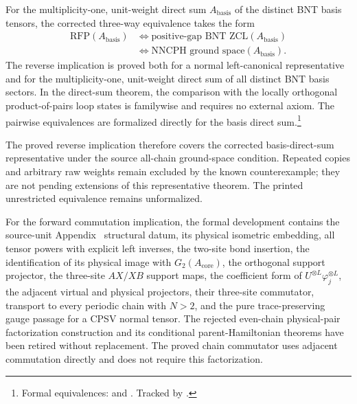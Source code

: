 \documentclass{article}
\begin{document}
For the multiplicity-one, unit-weight direct sum
$A_{\mathrm{basis}}$ of the distinct BNT basis tensors, the corrected
three-way equivalence takes the form
\begin{align}
    \mathrm{RFP}(A_{\mathrm{basis}})
        &\Longleftrightarrow
        \text{positive-gap BNT ZCL}(A_{\mathrm{basis}})
    \label{eq:cpsv16_nncph_ground_state_scope_representative_rfp_zcl}\\
        &\Longleftrightarrow
        \text{NNCPH ground space}(A_{\mathrm{basis}}).
    \label{eq:cpsv16_nncph_ground_state_scope_representative_nncph}
\end{align}
The reverse implication is proved both for a normal left-canonical
representative and for the multiplicity-one, unit-weight direct sum of all
distinct BNT basis sectors. In the direct-sum theorem, the comparison with the
locally orthogonal product-of-pairs loop states is familywise and requires no
external axiom. The pairwise equivalences are formalized directly for the basis
direct sum.\footnote{Formal equivalences:
and
.
Tracked by .}

The proved reverse implication therefore covers the corrected basis-direct-sum
representative under the source all-chain ground-space condition. Repeated
copies and arbitrary raw weights remain excluded by the known counterexample;
they are not pending extensions of this representative theorem. The printed
unrestricted equivalence remains unformalized.

For the forward commutation implication, the formal development contains the
source-unit Appendix~ structural datum, its physical
isometric embedding, all tensor powers with explicit left inverses, the
two-site bond insertion, the identification of its physical image with
$G_2(A_{\mathrm{core}})$, the orthogonal support projector, the three-site
$AX/XB$ support maps, the coefficient form of $U^{\otimes L}\varphi_j^{\otimes
L}$, the adjacent virtual and physical projectors, their three-site commutator,
transport to every periodic chain with $N>2$, and the pure trace-preserving
gauge passage for a CPSV normal tensor. The rejected even-chain physical-pair
factorization construction and its conditional parent-Hamiltonian theorems have
been retired without replacement. The proved chain commutator uses adjacent
commutation directly and does not require this factorization.
\end{document}

